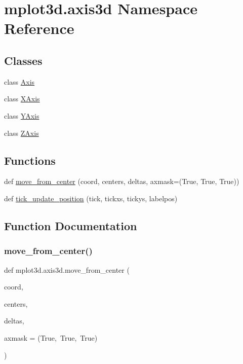 \hypertarget{namespacemplot3d_1_1axis3d}{}\section{mplot3d.\+axis3d Namespace Reference}
\label{namespacemplot3d_1_1axis3d}
\subsection*{Classes}
\begin{DoxyCompactItemize}
\item 
class \hyperlink{classmplot3d_1_1axis3d_1_1Axis}{Axis}
\item 
class \hyperlink{classmplot3d_1_1axis3d_1_1XAxis}{X\+Axis}
\item 
class \hyperlink{classmplot3d_1_1axis3d_1_1YAxis}{Y\+Axis}
\item 
class \hyperlink{classmplot3d_1_1axis3d_1_1ZAxis}{Z\+Axis}
\end{DoxyCompactItemize}
\subsection*{Functions}
\begin{DoxyCompactItemize}
\item 
def \hyperlink{namespacemplot3d_1_1axis3d_aea187ae6512e89fef564c563caa135ce}{move\+\_\+from\+\_\+center} (coord, centers, deltas, axmask=(True, True, True))
\item 
def \hyperlink{namespacemplot3d_1_1axis3d_a868d18d0c0072c9d132db752e282e581}{tick\+\_\+update\+\_\+position} (tick, tickxs, tickys, labelpos)
\end{DoxyCompactItemize}


\subsection{Function Documentation}
\mbox{\label{namespacemplot3d_1_1axis3d_aea187ae6512e89fef564c563caa135ce}} 
\subsubsection{\texorpdfstring{move\+\_\+from\+\_\+center()}{move\_from\_center()}}
{\footnotesize\ttfamily def mplot3d.\+axis3d.\+move\+\_\+from\+\_\+center (\begin{DoxyParamCaption}\item[{}]{coord,  }\item[{}]{centers,  }\item[{}]{deltas,  }\item[{}]{axmask = {\ttfamily (True,~True,~True)} }\end{DoxyParamCaption})}

